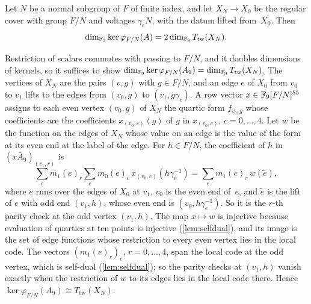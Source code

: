 \begin{lemma}\label{lem:tanner}
\notformalized
Let $N$ be a normal subgroup of $F$ of finite index, and let $X_N\to X_0$ be the regular cover with group $F/N$ and
voltages $\gamma_eN$, with the datum lifted from~$X_0$. Then
\[
  \dim_{\mathbb{F}_3}\ker\varphi_{F/N}(A)=2\dim_{\mathbb{F}_9}T_{\mathrm{tw}}(X_N).
\]
\end{lemma}
\begin{informalproof}
Restriction of scalars commutes with passing to $F/N$, and it doubles dimensions of kernels, so it suffices to show
$\dim_{\mathbb{F}_9}\ker\varphi_{F/N}(A_9)=\dim_{\mathbb{F}_9}T_{\mathrm{tw}}(X_N)$. The vertices of $X_N$ are the pairs $(v,g)$ with
$g\in F/N$, and an edge $e$ of $X_0$ from $v_0$ to $v_1$ lifts to the edges from $(v_0,g)$ to $(v_1,g\gamma_e)$. A row
vector $x\in\mathbb{F}_9[F/N]^{55}$ assigns to each even vertex $(v_0,g)$ of $X_N$ the quartic form $f_{v_0,g}$ whose
coefficients are the coefficients $x_{(v_0,c)}(g)$ of $g$ in $x_{(v_0,c)}$, $c=0,\dots,4$. Let $w$ be the function on the
edges of $X_N$ whose value on an edge is the value of the form at its even end at the label of the edge. For $h\in F/N$,
the coefficient of $h$ in $(x\bar A_9)_{(v_1,r)}$ is
\[
  \sum_{e}m_1(e)_r\sum_{c}m_0(e)_c\,x_{(v_0,c)}(h\gamma_e^{-1})=\sum_{e}m_1(e)_r\,w(\tilde e),
\]
where $e$ runs over the edges of $X_0$ at $v_1$, $v_0$ is the even end of~$e$, and $\tilde e$ is the lift of $e$ with odd
end $(v_1,h)$, whose even end is $(v_0,h\gamma_e^{-1})$. So it is the $r$-th parity check at the odd vertex $(v_1,h)$.
The map $x\mapsto w$ is injective because evaluation of quartics at ten points is injective (\cref{lem:selfdual}), and its
image is the set of edge functions whose restriction to every even vertex lies in the local code. The vectors
$(m_1(e)_r)_e$, $r=0,\dots,4$, span the local code at the odd vertex, which is self-dual (\cref{lem:selfdual}); so the
parity checks at $(v_1,h)$ vanish exactly when the restriction of $w$ to its edges lies in the local code there. Hence
$\ker\varphi_{F/N}(A_9)\cong T_{\mathrm{tw}}(X_N)$.
\end{informalproof}
